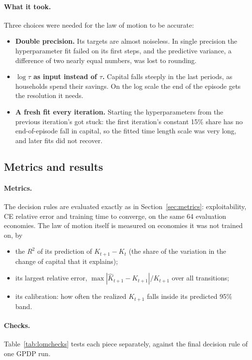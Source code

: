 \documentclass[11pt,a4paper]{article}
\begin{document}
\paragraph{What it took.} Three choices were needed for the law of motion to be accurate:
\begin{itemize}
\item \textbf{Double precision.} Its targets are almost noiseless. In single precision the
  hyperparameter fit failed on its first steps, and the predictive variance, a difference of two
  nearly equal numbers, was lost to rounding.
\item \textbf{$\log \tau$ as input instead of $\tau$.} Capital falls steeply in the last periods,
  as households spend their savings. On the log scale the end of the episode gets the resolution it
  needs.
\item \textbf{A fresh fit every iteration.} Starting the hyperparameters from the previous
  iteration's got stuck: the first iteration's constant 15\% share has no end-of-episode fall in
  capital, so the fitted time length scale was very long, and later fits did not recover.
\end{itemize}

\subsection{Metrics and results}

\paragraph{Metrics.} The decision rules are evaluated exactly as in Section~\ref{sec:metrics}:
exploitability, CE relative error and training time to converge, on the same 64 evaluation
economies. The law of motion itself is measured on economies it was not trained on, by
\begin{itemize}
\item the $R^2$ of its prediction of $K_{t+1} - K_t$ (the share of the variation in the change of
  capital that it explains);
\item its largest relative error, $\max |\widehat K_{t+1} - K_{t+1}| / K_{t+1}$ over all transitions;
\item its calibration: how often the realized $K_{t+1}$ falls inside its predicted 95\% band.
\end{itemize}

\paragraph{Checks.} Table~\ref{tab:lomchecks} tests each piece separately, against the final decision
rule of one GPDP run.
\end{document}
